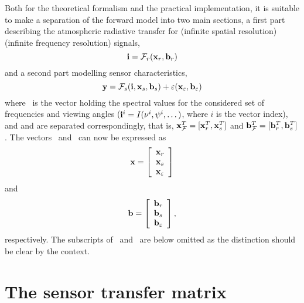  Both for the theoretical formalism and the practical implementation,
 it is suitable to make a separation of the forward model into two
 main sections, a first part describing the atmospheric radiative
 transfer for  (infinite spatial resolution)
  (infinite frequency resolution) signals,
 \begin{equation}
   \mathbf{i} = \mathcal{F}_r(\mathbf{x}_{r},\mathbf{b}_{r})
  \label{eq:formalism:fma}
 \end{equation}
 and a second part modelling sensor characteristics,
 \begin{equation}
   \mathbf{y} = \mathcal{F}_s(\mathbf{i},\mathbf{x}_{s},\mathbf{b}_{s}) + 
                       \varepsilon(\mathbf{x}_{\varepsilon},\mathbf{b}_{\varepsilon})
  \label{eq:formalism:fms}
 \end{equation}
 where \MpiVct\ is the vector holding the spectral values for the
 considered set of frequencies and viewing angles
 ($\mathbf{i}^i=I(\nu^i,\psi^i,\dots)$, where $i$ is the vector
 index), and \aSttVct{\FrwMdl} and \aFrwMdlVct{\FrwMdl} are separated
 correspondingly, that is, $\mathbf{x}_{\mathcal{F}}^T=
 [\mathbf{x}_{r}^T,\mathbf{x}_{s}^T]$ and $\mathbf{b}_{\mathcal{F}}^T=
 [\mathbf{b}_{r}^T,\mathbf{b}_{s}^T]$.  The vectors \SttVct\ and
 \FrwMdlVct\ can now be expressed as
 \begin{equation}
   \mathbf{x} = \left[ \begin{array}{c} \mathbf{x}_{r} \\ \mathbf{x}_{s} \\ 
                                       \mathbf{x}_{\varepsilon} \end{array} \right]
 \end{equation}
 and
 \begin{equation}
   \mathbf{b} = \left[ \begin{array}{c} \mathbf{b}_{r}\\ \mathbf{b}_{s} \\ 
                                    \mathbf{b}_{\varepsilon} \end{array}\right],
 \end{equation}
 respectively. The subscripts of \SttVct\ and \FrwMdlVct\ are below
 omitted as the distinction should be clear by the context.



\section{The sensor transfer matrix} 
 \label{sec:formalism:sensor}
  
